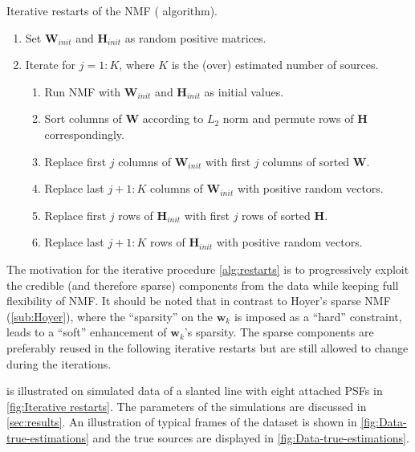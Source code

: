 \begin{algorithm}[hbt]
	\caption{Iterative restarts of the NMF (\inmf{} algorithm).}	
	\label{alg:restarts}
	\begin{enumerate}
		\item Set $\bm{W}_{init}$ and $\bm{H}_{init}$ as random positive matrices.
		\item Iterate for $j=1:K$, where $K$ is the (over) estimated number of sources.
		\begin{enumerate}
			\item Run NMF with $\bm{W}_{init}$ and $\bm{H}_{init}$ as initial values.
			\item Sort columns of $\bm{W}$ according to $L_2$ norm and permute rows of $\bm{H}$ correspondingly.
			\item Replace first $j$ columns of $\bm{W}_{init}$ with first $j$ columns of sorted $\bm{W}$.
			\item Replace last $j+1:K$ columns of $\bm{W}_{init}$ with positive random vectors.
			\item Replace first $j$ rows of $\bm{H}_{init}$ with first $j$ rows of sorted $\bm{H}$.
			\item Replace last $j+1:K$ rows of $\bm{H}_{init}$ with positive random vectors.
		\end{enumerate}
	\end{enumerate}    
\end{algorithm}

The motivation for the iterative procedure \autoref{alg:restarts} is to progressively exploit the credible (and therefore sparse) components from the data while keeping full flexibility of NMF. It should be noted that in contrast to Hoyer's sparse NMF (\autoref{sub:Hoyer}), where the ``sparsity'' on the $\bm{w}_k$ is imposed as a ``hard'' constraint, \inmf{} leads to a ``soft'' enhancement of $\bm{w}_k$'s sparsity. The sparse components are preferably reused in the following iterative restarts but are still allowed to change during the iterations. 

\inmf{} is illustrated on simulated data of a slanted line with eight attached PSFs in \autoref{fig:Iterative restarts}. The parameters of the simulations are discussed in  \autoref{sec:results}. An illustration of typical frames of the dataset is shown in \autoref{fig:Data-true-estimations}\aaa{} and the true sources are displayed in \autoref{fig:Data-true-estimations}\bbb.


